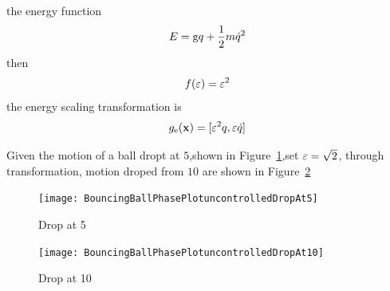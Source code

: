 the energy function 
\[
E=\mathrm{g}q+\frac{1}{2}m\dot{q}^2
\]
then
\[
f(\varepsilon)=\varepsilon^2
\]
the energy scaling transformation is
\[
g_{\mathrm{e}}(\mathbf{x})=[\varepsilon^2 q, \varepsilon \dot{q}]
\]

Given the motion of a ball dropt at $5$,shown in Figure~\ref{fig:bouncing5},set $\varepsilon=\sqrt{2}$, through transformation, motion droped from $10$ are shown in Figure~\ref{fig:bouncing10}
\begin{figure}[!htbp]
  \begin{center}
      \texttt{[image: BouncingBallPhasePlotuncontrolledDropAt5]}
    \caption{Drop at 5}
    \label{fig:bouncing5}
\end{center}
\end{figure}


\begin{figure}[!htbp]
  \begin{center}
      \texttt{[image: BouncingBallPhasePlotuncontrolledDropAt10]}
    \caption{Drop at 10}
    \label{fig:bouncing10}
\end{center}
\end{figure}




